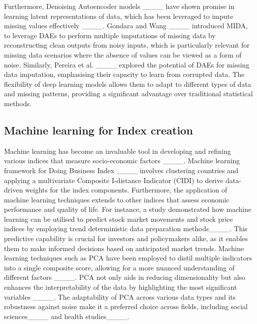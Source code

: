Furthermore,  Denoising Autoencoder models ____ have shown promise in learning latent representations of data, which has been leveraged to impute missing values effectively ____. Gondara and Wang ____ introduced MIDA, to leverage  DAEs to perform multiple imputations of missing data by reconstructing clean outputs from noisy inputs, which is particularly relevant for missing data scenarios where the absence of values can be viewed as a form of noise. Similarly, Pereira et al. ____ explored the potential of DAEs for missing data imputation, emphasising their capacity to learn from corrupted data. 
The flexibility of deep learning models allows them to adapt to different types of data and missing patterns, providing a significant advantage over traditional statistical methods.

\subsection{Machine learning for Index creation}
 

Machine learning has become an invaluable tool in developing and refining various indices that measure socio-economic factors ____. Machine learning framework for  Doing Business Index ____  involves clustering countries and applying a multivariate Composite I-distance Indicator (CIDI) to derive data-driven weights for the index components. Furthermore, the application of machine learning techniques extends to other indices that assess economic performance and quality of life. For instance, a study demonstrated how machine learning can be utilised to predict stock market movements and stock price indices by employing trend deterministic data preparation methods____. This predictive capability is crucial for investors and policymakers alike, as it enables them to make informed decisions based on anticipated market trends. Machine learning techniques such as PCA have been employed to distil multiple indicators into a single composite score, allowing for a more nuanced understanding of different factors ____.  PCA not only aids in reducing dimensionality but also enhances the interpretability of the data by highlighting the most significant variables ____. The adaptability of PCA across various data types and its robustness against noise make it a preferred choice across fields, including social sciences____ and health studies____. 
 

